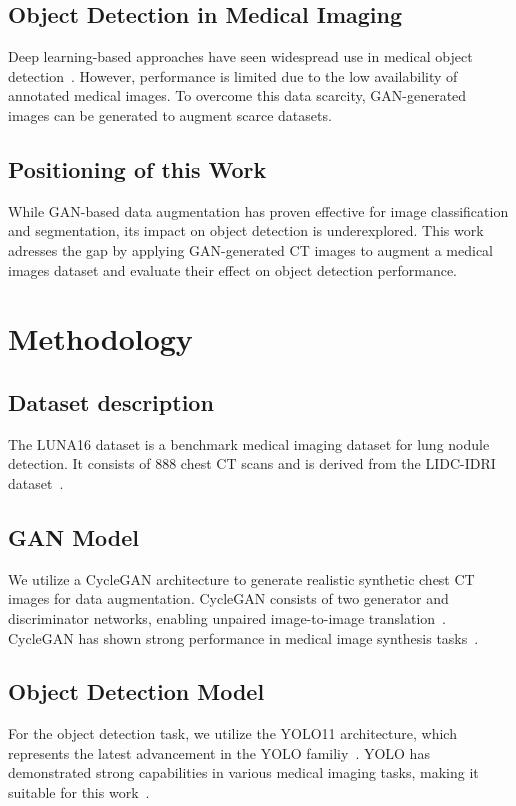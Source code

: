 \documentclass[runningheads]{llncs}
\begin{document}
\subsection{Object Detection in Medical Imaging} %
Deep learning-based approaches have seen widespread use in medical object detection~\cite{albuquerque2025deep}\cite{yang2021artificial}. However, performance is limited due to the low availability of annotated medical images. To overcome this data scarcity, GAN-generated images can be generated to augment scarce datasets.
\subsection{Positioning of this Work} %
While GAN-based data augmentation has proven effective for image classification and segmentation, its impact on object detection is underexplored. This work adresses the gap by applying GAN-generated CT images to augment a medical images dataset and evaluate their effect on object detection performance.

\section{Methodology} %
\subsection{Dataset description} %
The LUNA16 dataset is a benchmark medical imaging dataset for lung nodule detection. It consists of 888 chest CT scans and is derived from the LIDC-IDRI dataset~\cite{luna16}.
\subsection{GAN Model} %
We utilize a CycleGAN architecture to generate realistic synthetic chest CT images for data augmentation. CycleGAN consists of two generator and discriminator networks, enabling unpaired image-to-image translation~\cite{zhu2020unpairedimagetoimagetranslationusing}. CycleGAN has shown strong performance in medical image synthesis tasks~\cite{cycleganeaugmentation}\cite{sandfort2019data}.
\subsection{Object Detection Model} %
For the object detection task, we utilize the YOLO11 architecture, which represents the latest advancement in the YOLO familiy~\cite{yolo11}. YOLO has demonstrated strong capabilities in various medical imaging tasks, making it suitable for this work~\cite{yoloreview}.
\end{document}
